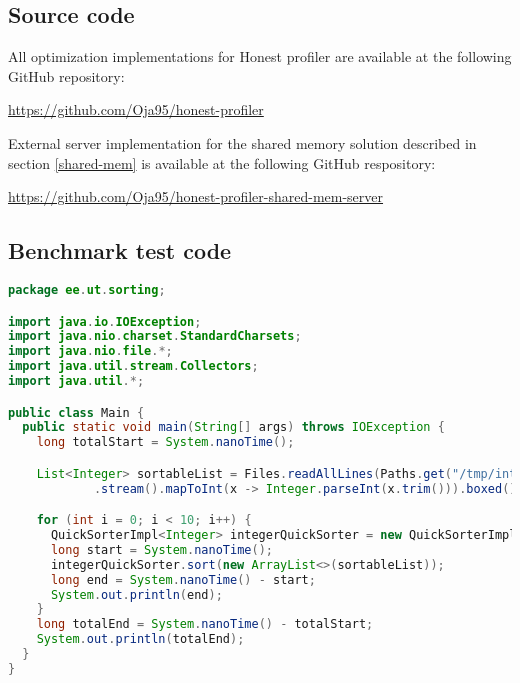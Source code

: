 \documentclass[..thesis.tex]{subfiles}
\begin{document}
\subsection{Source code}
\label{B:source-code}
All optimization implementations for Honest profiler are available at the following GitHub repository:

\url{https://github.com/Oja95/honest-profiler}

External server implementation for the shared memory solution described in section \ref{shared-mem} is available at the following GitHub respository:

\url{https://github.com/Oja95/honest-profiler-shared-mem-server}

\subsection{Benchmark test code}
\label{B:benchmark-test-code}

\begin{lstlisting}[language=Java,style=def]
package ee.ut.sorting;

import java.io.IOException;
import java.nio.charset.StandardCharsets;
import java.nio.file.*;
import java.util.stream.Collectors;
import java.util.*;

public class Main {
  public static void main(String[] args) throws IOException {
    long totalStart = System.nanoTime();

    List<Integer> sortableList = Files.readAllLines(Paths.get("/tmp/integers.data"), StandardCharsets.UTF_8)
            .stream().mapToInt(x -> Integer.parseInt(x.trim())).boxed().collect(Collectors.toList());

    for (int i = 0; i < 10; i++) {
      QuickSorterImpl<Integer> integerQuickSorter = new QuickSorterImpl<>();
      long start = System.nanoTime();
      integerQuickSorter.sort(new ArrayList<>(sortableList));
      long end = System.nanoTime() - start;
      System.out.println(end);
    }
    long totalEnd = System.nanoTime() - totalStart;
    System.out.println(totalEnd);
  }
}

\end{lstlisting}

\newpage
\end{document}
